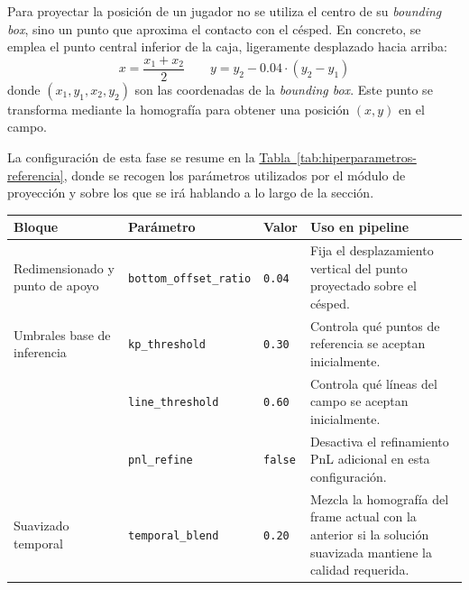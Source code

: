 Para proyectar la posición de un jugador no se utiliza el centro de su \textit{bounding box}, sino un punto que aproxima el contacto con el césped. En concreto, se emplea el punto central inferior de la caja, ligeramente desplazado hacia arriba:
\[
x = \frac{x_1 + x_2}{2}
\qquad
y = y_2 - 0.04 \cdot (y_2 - y_1)
\]
donde $(x_1,y_1,x_2,y_2)$ son las coordenadas de la \textit{bounding box}. Este punto se transforma mediante la homografía para obtener una posición $(x,y)$ en el campo.

La configuración de esta fase se resume en la \hyperref[tab:hiperparametros-referencia]{Tabla~\ref*{tab:hiperparametros-referencia}}, donde se recogen los parámetros utilizados por el módulo de proyección y sobre los que se irá hablando a lo largo de la sección.

\begin{table}[htbp]
\centering
\scriptsize
\setlength{\tabcolsep}{3pt}
\renewcommand{\arraystretch}{1.10}
\begin{tabularx}{\textwidth}{
>{\raggedright\arraybackslash}p{2.5cm}
>{\raggedright\arraybackslash}p{3.3cm}
>{\raggedright\arraybackslash}p{1.4cm}
>{\raggedright\arraybackslash}X
}
\toprule
\textbf{Bloque} & \textbf{Parámetro} & \textbf{Valor} & \textbf{Uso en pipeline} \\
\midrule

Redimensionado y punto de apoyo &
\texttt{bottom\_offset\_ratio} &
\texttt{0.04} &
Fija el desplazamiento vertical del punto proyectado sobre el césped. \\

\midrule

Umbrales base de inferencia &
\texttt{kp\_threshold} &
\texttt{0.30} &
Controla qué puntos de referencia se aceptan inicialmente. \\

&
\texttt{line\_threshold} &
\texttt{0.60} &
Controla qué líneas del campo se aceptan inicialmente. \\

&
\texttt{pnl\_refine} &
\texttt{false} &
Desactiva el refinamiento PnL adicional en esta configuración. \\

\midrule

Suavizado temporal &
\texttt{temporal\_blend} &
\texttt{0.20} &
Mezcla la homografía del frame actual con la anterior si la solución suavizada mantiene la calidad requerida. \\

\midrule


\end{tabularx}
\end{table}
